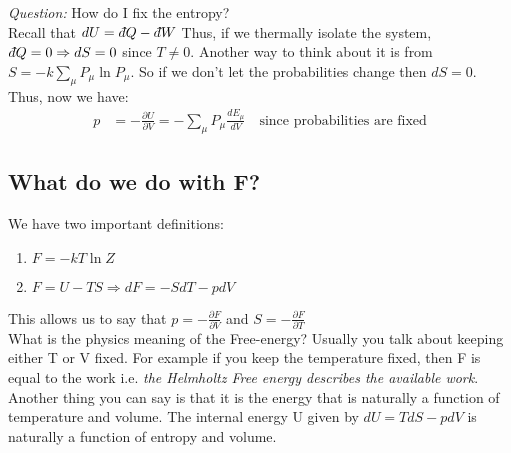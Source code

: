 \documentclass[a4paper, 11pt]{article}
\newcommand{\dbar}{{\mkern3mu\mathchar'26\mkern-12mu d}}
\begin{document}
	\noindent \textit{Question:} How do I fix the entropy?\\
	 
		\noindent Recall that $dU = \dbar Q - \dbar W $ Thus, if we thermally isolate the system, $\dbar Q = 0 \Rightarrow dS = 0$ since $T\neq 0$. Another way to think about it is from $S=-k\sum\limits_\mu P_\mu \ln P_\mu $. So if we don't let the probabilities change then $dS = 0$. \\
	  
	 Thus, now we have: 
		 \begin{align*}
			 p &= -\frac{\partial U}{\partial V} = -\sum\limits_\mu P_\mu \frac{dE_\mu}{dV} \quad \text{since probabilities are fixed} 
		 \end{align*}
		 
\subsection*{What do we do with F?} 
	We have two important definitions: 
		\begin{enumerate}
			\item $F = -kT\ln Z $ 
			\item $F = U - TS \Rightarrow dF = -SdT -pdV$ 
		\end{enumerate}
	This allows us to say that $p = -\frac{\partial F}{\partial V}$ and $S = -\frac{\partial F}{\partial T}$ \\
	
	\noindent What is the physics meaning of the Free-energy? Usually you talk about keeping either T or V fixed. For example if you keep the temperature fixed, then F is equal to the work i.e. \textit{the Helmholtz Free energy describes the available work}. Another thing you can say is that it is the energy that is naturally a function of temperature and volume. The internal energy U given by $dU = TdS - pdV$ is naturally a function of entropy and volume. 
\end{document}
